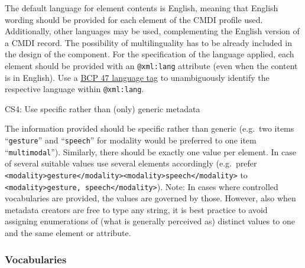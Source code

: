 The default language for element contents is English, meaning that English wording should be provided for each element of the CMDI profile used. Additionally, other languages may be used, complementing the English version of a CMDI record. The possibility of multilinguality has to be already included in the design of the component. For the specification of the language applied, each element should be provided with an \texttt{@xml:lang} attribute (even when the content is in
English). Use a \href{https://tools.ietf.org/rfc/bcp/bcp47.txt}{BCP 47 language tag} \cite{bcp47} to unambiguously identify the respective language within \texttt{@xml:lang}.

CS4: Use specific rather than (only) generic metadata


The information provided should be specific rather than generic
(e.g.~two items ``\texttt{gesture}'' and ``\texttt{speech}'' for modality would be preferred to one item ``\texttt{multimodal}''). Similarly, there should be exactly one value per element. In case of several suitable values use several elements accordingly (e.g.~prefer
\texttt{\textless{}modality\textgreater{}gesture\textless{}/modality\textgreater{}\textless{}modality\textgreater{}speech\textless{}/modality\textgreater{}} to \texttt{\textless{}modality\textgreater{}gesture,\ speech\textless{}/modality\textgreater{}}). Note: In cases where controlled vocabularies are provided, the values are governed by those. However, also when metadata creators are free to type any string, it is best practice to avoid assigning enumerations of (what is generally perceived as) distinct values to one and the same element or attribute.

\subsubsection{Vocabularies}\label{vocabularies}

